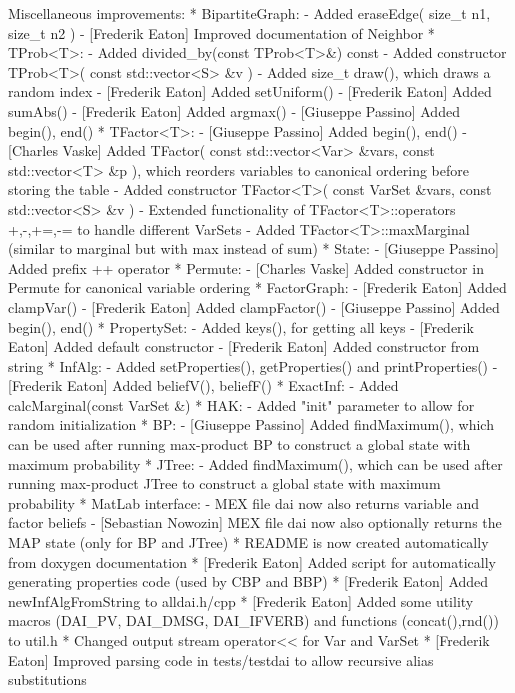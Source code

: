 \begin{DoxyVerbInclude}
Miscellaneous improvements:
* BipartiteGraph:
  - Added eraseEdge( size_t n1, size_t n2 )
  - [Frederik Eaton] Improved documentation of Neighbor
* TProb<T>:
  - Added divided_by(const TProb<T>&) const
  - Added constructor TProb<T>( const std::vector<S> &v )
  - Added size_t draw(), which draws a random index
  - [Frederik Eaton] Added setUniform()
  - [Frederik Eaton] Added sumAbs()
  - [Frederik Eaton] Added argmax()
  - [Giuseppe Passino] Added begin(), end()
* TFactor<T>:
  - [Giuseppe Passino] Added begin(), end()
  - [Charles Vaske] Added TFactor( const std::vector<Var> &vars, const std::vector<T> &p ),
    which reorders variables to canonical ordering before storing the table
  - Added constructor TFactor<T>( const VarSet &vars, const std::vector<S> &v )
  - Extended functionality of TFactor<T>::operators +,-,+=,-= to handle different VarSets
  - Added TFactor<T>::maxMarginal (similar to marginal but with max instead of sum)
* State:
  - [Giuseppe Passino] Added prefix ++ operator
* Permute:
  - [Charles Vaske] Added constructor in Permute for canonical variable ordering
* FactorGraph:
  - [Frederik Eaton] Added clampVar()
  - [Frederik Eaton] Added clampFactor()
  - [Giuseppe Passino] Added begin(), end()
* PropertySet:
  - Added keys(), for getting all keys
  - [Frederik Eaton] Added default constructor
  - [Frederik Eaton] Added constructor from string
* InfAlg:
  - Added setProperties(), getProperties() and printProperties()
  - [Frederik Eaton] Added beliefV(), beliefF()
* ExactInf:
  - Added calcMarginal(const VarSet &)
* HAK:
  - Added "init" parameter to allow for random initialization
* BP:
  - [Giuseppe Passino] Added findMaximum(), which can be used after running
    max-product BP to construct a global state with maximum probability
* JTree:
  - Added findMaximum(), which can be used after running
    max-product JTree to construct a global state with maximum probability
* MatLab interface:
  - MEX file dai now also returns variable and factor beliefs
  - [Sebastian Nowozin] MEX file dai now also optionally returns the MAP state
    (only for BP and JTree)
* README is now created automatically from doxygen documentation
* [Frederik Eaton] Added script for automatically generating properties code (used by CBP and BBP)
* [Frederik Eaton] Added newInfAlgFromString to alldai.h/cpp
* [Frederik Eaton] Added some utility macros (DAI_PV, DAI_DMSG, DAI_IFVERB)
  and functions (concat(),rnd()) to util.h
* Changed output stream operator<< for Var and VarSet
* [Frederik Eaton] Improved parsing code in tests/testdai to allow recursive
  alias substitutions

\end{DoxyVerbInclude}
